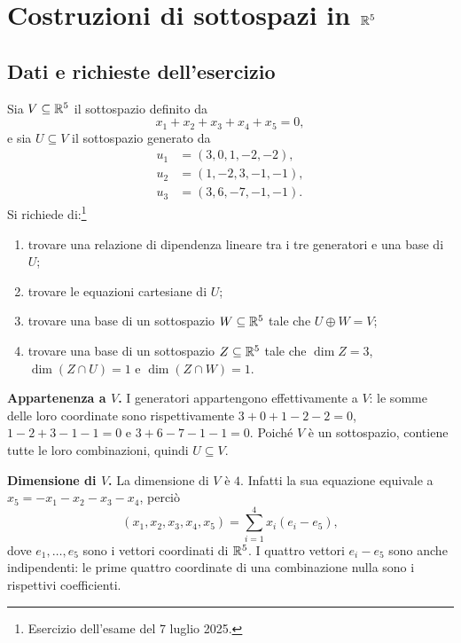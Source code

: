 
\section{Costruzioni di sottospazi in \texorpdfstring{$\mathbb{R}^5$}{R5}}

\subsection{Dati e richieste dell'esercizio}
\begin{esercizio}
Sia $V\subseteq\mathbb{R}^5$ il sottospazio definito da
\[
  x_1+x_2+x_3+x_4+x_5=0,
\]
e sia $U\subseteq V$ il sottospazio generato da
\begin{align*}
  u_1&=(3,0,1,-2,-2),\\
  u_2&=(1,-2,3,-1,-1),\\
  u_3&=(3,6,-7,-1,-1).
\end{align*}
Si richiede di:\footnote{Esercizio dell'esame del 7 luglio 2025.}
\begin{enumerate}[label=(\alph*)]
  \item trovare una relazione di dipendenza lineare tra i tre generatori e una base di $U$;
  \item trovare le equazioni cartesiane di $U$;
  \item trovare una base di un sottospazio $W\subseteq\mathbb{R}^5$ tale che $U\oplus W=V$;
  \item trovare una base di un sottospazio $Z\subseteq\mathbb{R}^5$ tale che $\dim Z=3$, $\dim(Z\cap U)=1$ e $\dim(Z\cap W)=1$.
\end{enumerate}
\end{esercizio}

\begin{svolgimento}
\textbf{Appartenenza a $V$.} I generatori appartengono effettivamente a $V$: le somme delle loro coordinate sono rispettivamente $3+0+1-2-2=0$, $1-2+3-1-1=0$ e $3+6-7-1-1=0$. Poiché $V$ è un sottospazio, contiene tutte le loro combinazioni, quindi $U\subseteq V$.

\textbf{Dimensione di $V$.} La dimensione di $V$ è $4$. Infatti la sua equazione equivale a $x_5=-x_1-x_2-x_3-x_4$, perciò
\[
  (x_1,x_2,x_3,x_4,x_5)=\sum_{i=1}^4 x_i(e_i-e_5),
\]
dove $e_1,\ldots,e_5$ sono i vettori coordinati di $\mathbb{R}^5$. I quattro vettori $e_i-e_5$ sono anche indipendenti: le prime quattro coordinate di una combinazione nulla sono i rispettivi coefficienti.
\end{svolgimento}

